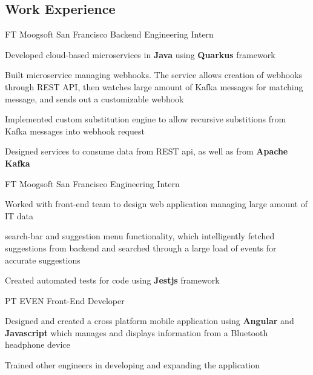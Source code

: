 \documentclass[10pt]{article}
\begin{document}
\begin{paracol}{2} %


\section{Work Experience}


{FT}
{Moogsoft}
{San Francisco}
{Backend Engineering Intern}
{}
{
\item Developed cloud-based microservices in \textbf{Java} using \textbf{Quarkus} framework
\item Built microservice managing webhooks. The service allows creation of webhooks through REST API, then watches large amount of Kafka messages for matching message, and sends out a customizable webhook
\item Implemented custom substitution engine to allow recursive substitions from Kafka messages into webhook request
\item Designed services to consume data from REST api, as well as from \textbf{Apache Kafka}
}

{FT}
{Moogsoft}
{San Francisco}
{Engineering Intern}
{}
{
\item Worked with front-end team to design web application managing large amount of IT data
\item search-bar and suggestion menu functionality, which intelligently fetched suggestions from backend and searched through a large load of events for accurate suggestions
\item Created automated tests for code using \textbf{Jestjs} framework
}

{PT}
{EVEN}
{}
{Front-End Developer}
{}
{
\item Designed and created a cross platform mobile application using \textbf{Angular}
  and \textbf{Javascript} which manages and displays information from a Bluetooth
  headpho\-ne device
\item Trained other engineers in developing and expanding the application
}


\end{paracol}
\end{document}
